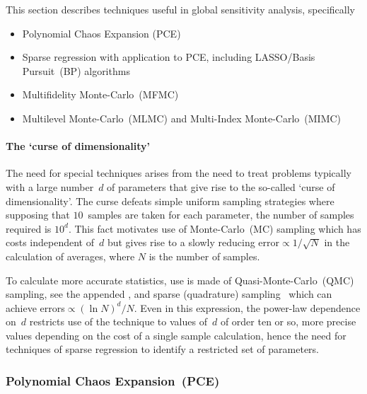 This section describes techniques useful in global sensitivity analysis, specifically
\begin{itemize}
\item Polynomial Chaos Expansion (PCE)
\item Sparse regression with application to PCE, including LASSO/Basis Pursuit~(BP) algorithms
\item Multifidelity Monte-Carlo~(MFMC)
\item Multilevel Monte-Carlo~(MLMC)  and Multi-Index Monte-Carlo~(MIMC)
\end{itemize}
\paragraph{The `curse of dimensionality'}
The need for special techniques arises from the need to treat problems
typically with a large number~$d$ of parameters that give
rise to the so-called  `curse of dimensionality'. The curse defeats
simple uniform sampling strategies where supposing that $10$~samples are taken for
each parameter, the number of samples required is $10^d$.
This fact motivates use of Monte-Carlo~(MC) sampling
which has costs independent of~$d$ but gives rise to a slowly reducing error$\propto 1/\sqrt{N}$ in 
the calculation of averages, where $N$ is the number of samples.

To calculate more accurate statistics, use is made of
Quasi-Monte-Carlo~(QMC) sampling, see the appended ,
and sparse (quadrature) sampling~ which can achieve errors$\propto (\ln N)^d/N$.
Even in this expression, the power-law dependence on~$d$ restricts use of the technique to values of~$d$ of order ten or so,
more precise values depending on the cost of a single sample calculation, hence the need
for techniques of sparse regression to identify a restricted set of parameters.

\subsubsection{Polynomial Chaos Expansion~(PCE)}\label{sec:PCE}

